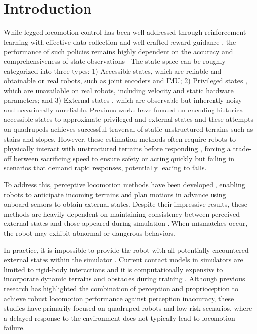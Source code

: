 \section{Introduction} \label{sec:intro}

While legged locomotion control has been well-addressed through reinforcement learning with effective data collection \cite{makoviychuk2021isaac, gu2024humanoid, Genesis, zakka2025mujoco} and well-crafted reward guidance \cite{margolis2023walk, hwangbo2019learning, radosavovic2024learning, chen2024learning, li2023robust, long2024learning, margolis2024rapid}, the performance of such policies remains highly dependent on the accuracy and comprehensiveness of state observations \cite{nahrendra2023dreamwaq, sun2024leg, long2024hybrid, margolis2024rapid}. The state space can be roughly categorized into three types: 1) Accessible states, which are reliable and obtainable on real robots, such as joint encoders and IMU; 2) Privileged states \cite{kumar2021rma, lee2020learning}, which are unavailable on real robots, including velocity and static hardware parameters; and 3) External states \cite{miki2022learning, li2023robust, zhuang2024humanoid, long2024learning, yang2021learning}, which are observable but inherently noisy and occasionally unreliable. Previous works \cite{lee2020learning, kumar2021rma} have focused on encoding historical accessible states to approximate privileged and external states and these attempts on quadrupeds achieves successful traversal of static unstructured terrains such as stairs and slopes. However, these estimation methods often require robots to physically interact with unstructured terrains before responding \cite{long2024hybrid, cuiadapting, margolis2023walk}, forcing a trade-off between sacrificing speed to ensure safety or acting quickly but failing in scenarios that demand rapid responses, potentially leading to falls. 

To address this, perceptive locomotion methods have been developed \cite{cheng2024extreme, agarwal2023legged, yang2023neural}, enabling robots to anticipate incoming terrains and plan motions in advance using onboard sensors to obtain external states. Despite their impressive results, these methods are heavily dependent on maintaining consistency between perceived external states and those appeared during simulation \cite{hoeller2024anymal}. When mismatches occur, the robot may exhibit abnormal or dangerous behaviors.

In practice, it is impossible to provide the robot with all potentially encountered external states within the simulator \cite{zhu2025vr}. Current contact models in simulators are limited to rigid-body interactions and it is computationally expensive to incorporate dynamic terrains and obstacles during training \cite{choi2023learning}. Although previous research has highlighted the combination of perception and proprioception to achieve robust locomotion performance \cite{miki2022learning, zhang2024resilient, fu2022coupling} against perception inaccuracy, these studies have primarily focused on quadruped robots and low-risk scenarios, where a delayed response to the environment does not typically lead to locomotion failure.

